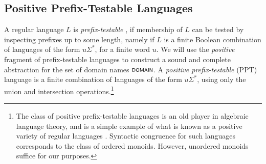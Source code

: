 \subsection{Positive Prefix-Testable Languages}\label{subsec:ppt}
A regular language $L$ is \emph{prefix-testable} \cite{almeida1995finite,van2013separation}, if membership of $L$ can be tested by inspecting prefixes up to some length, namely if $L$ is a finite Boolean combination of languages of the form $u\Sigma^*$, for a finite word $u$. 
We will use the \emph{positive} fragment of prefix-testable languages to construct a sound and complete abstraction for the set of domain names $\scrsf{domain}$. A \emph{positive prefix-testable} (PPT) language is a finite combination of languages of the form $u\Sigma^*$, using only the union and intersection operations.\footnote{The class of positive prefix-testable languages is an old player in algebraic language theory, and is a simple example of what is known as a positive variety of regular languages \cite{pin1995variety}. Syntactic congruence for such languages corresponds to the class of ordered monoids. However, unordered monoids suffice for our purposes.}

